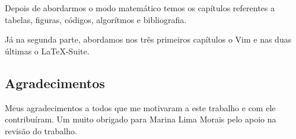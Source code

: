 Depois de abordarmos o modo matemático temos os capítulos referentes a tabelas, figuras, códigos, algorítmos e bibliografia.

Já na segunda parte, abordamos nos três primeiros capítulos o Vim e nas duas últimas o LaTeX-Suite.

\subsection*{Agradecimentos}
Meus agradecimentos a todos que me motivaram a este trabalho e com ele contribuíram. Um muito obrigado para Marina Lima Morais pelo apoio na revisão do trabalho.
